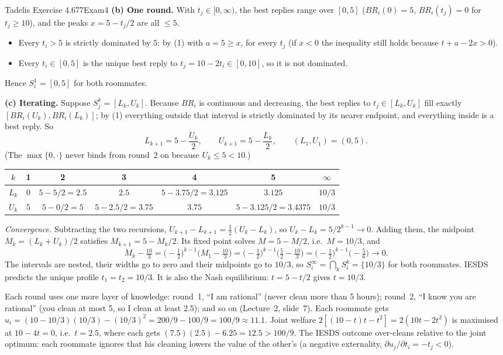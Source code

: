 \begin{exsol}{Tadelis Exercise 4.6}{77}{Exam}{4}
\textbf{(b) One round.} With $t_j \in [0, \infty)$, the best replies range over $[0, 5]$
($BR_i(0) = 5$, $BR_i(t_j) = 0$ for $t_j \ge 10$), and the peaks $x = 5 - t_j/2$ are all
$\le 5$.
\begin{itemize}
  \item Every $t_i > 5$ is strictly dominated by $5$: by (1) with $a = 5 \ge x$, for every $t_j$
  (if $x < 0$ the inequality still holds because $t + a - 2x > 0$).
  \item Every $t_i \in [0, 5]$ is the unique best reply to $t_j = 10 - 2t_i \in [0, 10]$, so it is
  not dominated.
\end{itemize}
Hence $S_i^1 = [0, 5]$ for both roommates.

\textbf{(c) Iterating.} Suppose $S_j^k = [L_k, U_k]$. Because $BR_i$ is continuous and decreasing,
the best replies to $t_j \in [L_k, U_k]$ fill exactly $[BR_i(U_k), BR_i(L_k)]$; by (1) everything
outside that interval is strictly dominated by its nearer endpoint, and everything inside is a best
reply. So
\[
  L_{k+1} = 5 - \frac{U_k}{2}, \qquad U_{k+1} = 5 - \frac{L_k}{2}, \qquad (L_1, U_1) = (0, 5).
\]
(The $\max\{0,\cdot\}$ never binds from round~2 on because $U_k \le 5 < 10$.)
\begin{center}
\begin{tabular}{c|cccccc}
$k$ & 1 & 2 & 3 & 4 & 5 & $\infty$ \\ \hline
$L_k$ & $0$ & $5 - 5/2 = 2.5$ & $2.5$ & $5 - 3.75/2 = 3.125$ & $3.125$ & $10/3$ \\
$U_k$ & $5$ & $5 - 0/2 = 5$ & $5 - 2.5/2 = 3.75$ & $3.75$ & $5 - 3.125/2 = 3.4375$ & $10/3$
\end{tabular}
\end{center}
\emph{Convergence.} Subtracting the two recursions,
$U_{k+1} - L_{k+1} = \tfrac12 (U_k - L_k)$, so $U_k - L_k = 5/2^{k-1} \to 0$. Adding them, the
midpoint $M_k = (L_k + U_k)/2$ satisfies $M_{k+1} = 5 - M_k/2$. Its fixed point solves
$M = 5 - M/2$, i.e.\ $M = 10/3$, and
\[
  M_k - \tfrac{10}{3} = \big(-\tfrac12\big)^{k-1}\big(M_1 - \tfrac{10}{3}\big)
  = \big(-\tfrac12\big)^{k-1}\big(\tfrac52 - \tfrac{10}{3}\big)
  = \big(-\tfrac12\big)^{k-1}\big(-\tfrac56\big) \to 0 .
\]
The intervals are nested, their widths go to zero and their midpoints go to $10/3$, so
$S_i^\infty = \bigcap_k S_i^k = \{10/3\}$ for both roommates. IESDS predicts the unique profile
$t_1 = t_2 = 10/3$. It is also the Nash equilibrium: $t = 5 - t/2$ gives $t = 10/3$.

\interp Each round uses one more layer of knowledge: round~1, ``I am rational'' (never clean more
than 5 hours); round~2, ``I know you are rational'' (you clean at most 5, so I clean at least
2.5); and so on (Lecture~2, slide~7). Each roommate gets
$u_i = (10 - 10/3)(10/3) - (10/3)^2 = 200/9 - 100/9 = 100/9 \approx 11.1$. Joint welfare
$2[(10 - t)t - t^2] = 2(10t - 2t^2)$ is maximised at $10 - 4t = 0$, i.e.\ $t = 2.5$, where each
gets $(7.5)(2.5) - 6.25 = 12.5 > 100/9$. The IESDS outcome over-cleans relative to the joint
optimum: each roommate ignores that his cleaning lowers the value of the other's (a negative
externality, $\partial u_j/\partial t_i = -t_j < 0$).


\end{exsol}
